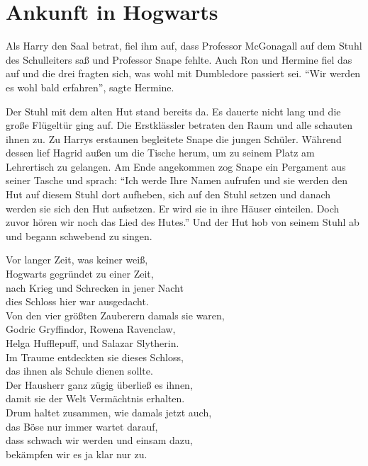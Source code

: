 \chapter{Ankunft in Hogwarts}


Als Harry den Saal betrat, fiel ihm auf, dass Professor McGonagall auf dem Stuhl des Schulleiters saß und Professor Snape fehlte. Auch Ron und Hermine fiel das auf und die drei fragten sich, was wohl mit Dumbledore passiert sei. \enquote{Wir werden es wohl bald erfahren}, sagte Hermine.

Der Stuhl mit dem alten Hut stand bereits da. Es dauerte nicht lang und die große Flügeltür ging auf. Die Erstklässler betraten den Raum und alle schauten ihnen zu. Zu Harrys erstaunen begleitete Snape die jungen Schüler. Während dessen lief Hagrid außen um die Tische herum, um zu seinem Platz am Lehrertisch zu gelangen. Am Ende angekommen zog Snape ein Pergament aus seiner Tasche und sprach: \enquote{Ich werde Ihre Namen aufrufen und sie werden den Hut auf diesem Stuhl dort aufheben, sich auf den Stuhl setzen und danach werden sie sich den Hut aufsetzen. Er wird sie in ihre Häuser einteilen. Doch zuvor hören wir noch das Lied des Hutes.} Und der Hut hob von seinem Stuhl ab und begann schwebend zu singen.

\begin{lied}
Vor langer Zeit, was keiner weiß,\\
Hogwarts gegründet zu einer Zeit,\\
nach Krieg und Schrecken in jener Nacht\\
dies Schloss hier war ausgedacht.\\
Von den vier größten Zauberern damals sie waren,\\
Godric Gryffindor, Rowena Ravenclaw,\\
Helga Hufflepuff, und Salazar Slytherin.\\
Im Traume entdeckten sie dieses Schloss,\\
das ihnen als Schule dienen sollte.\\
Der Hausherr ganz zügig überließ es ihnen,\\
damit sie der Welt Vermächtnis erhalten.\\
Drum haltet zusammen, wie damals jetzt auch,\\
das Böse nur immer wartet darauf,\\
dass schwach wir werden und einsam dazu,\\
bekämpfen wir es ja klar nur zu.
\end{lied}

